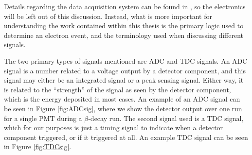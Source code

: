 Details regarding the data acquisition system can be found in \cite{plaster2012,mpmThesis},
so the electronics will be left out of this discussion. Instead, what is more important for
understanding the work contained within this thesis is the primary logic used to
determine an electron event, and the terminology used when discussing different signals.

The two primary types of signals mentioned are ADC and TDC signals.
An ADC signal is a number related to a voltage output by a detector component, and this
signal may either be an integrated signal or a peak sensing signal. Either way, it is related
to the ``strength'' of the signal as seen by the detector component, which is the energy deposited
in most cases. An example of an ADC signal can be seen in Figure \ref{fig:ADCsig}, where we show the
detector output over one run for a single PMT during a $\beta$-decay run.
The second signal used is a TDC signal, which for our purposes is
just a timing signal to indicate when a detector component triggered, or if it triggered at all.
An example TDC signal can be
seen in Figure \ref{fig:TDCsig}.

